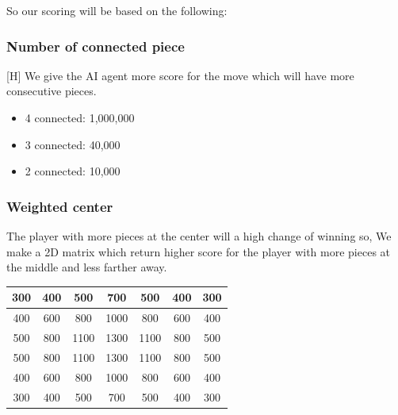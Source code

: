 \documentclass{article}
\begin{document}
So our scoring will be based on the following:
\subsubsection*{Number of connected piece}[H]
We give the AI agent more score for the move which will have more consecutive pieces.
\begin{itemize}
    \item 4 connected: 1,000,000
    \item 3 connected: 40,000
    \item 2 connected: 10,000
\end{itemize}
\subsubsection*{Weighted center}
The player with more pieces at the center will a high change of winning so, We make a 2D matrix
which return higher score for the player with more pieces at the middle and less farther away.
\begin{center}
    \setlength{\tabcolsep}{2pt} %
    \renewcommand{\arraystretch}{1.5} %
    \begin{tabular*}{0.3217\textwidth}{|c|c|c|c|c|c|c|}
        \hline  
        \cellcolor{blue!25}300 & \cellcolor{blue!25}400 & \cellcolor{blue!25}500 & \cellcolor{green!25}700 & \cellcolor{blue!25}500 & \cellcolor{blue!25}400 & \cellcolor{blue!25}300 \\
        \hline  
        \cellcolor{blue!25}400 & \cellcolor{blue!25}600 & \cellcolor{green!25}800 & \cellcolor{green!35}1000 & \cellcolor{green!25}800 & \cellcolor{blue!25}600 & \cellcolor{blue!25}400 \\  
        \hline  
        \cellcolor{blue!25}500 & \cellcolor{green!25}800 & \cellcolor{green!35}1100 & \cellcolor{green!40}1300 & \cellcolor{green!35}1100 & \cellcolor{green!25}800 & \cellcolor{blue!25}500 \\  
        \hline  
        \cellcolor{blue!25}500 & \cellcolor{green!25}800 & \cellcolor{green!35}1100 & \cellcolor{green!40}1300 & \cellcolor{green!35}1100 & \cellcolor{green!25}800 & \cellcolor{blue!25}500 \\  
        \hline  
        \cellcolor{blue!25}400 & \cellcolor{blue!25}600 & \cellcolor{green!25}800 & \cellcolor{green!35}1000 & \cellcolor{green!25}800 & \cellcolor{blue!25}600 & \cellcolor{blue!25}400 \\  
        \hline  
        \cellcolor{blue!25}300 & \cellcolor{blue!25}400 & \cellcolor{blue!25}500 & \cellcolor{green!25}700 & \cellcolor{blue!25}500 & \cellcolor{blue!25}400 & \cellcolor{blue!25}300 \\  
        \hline  
    \end{tabular*}
\end{center}
\end{document}
